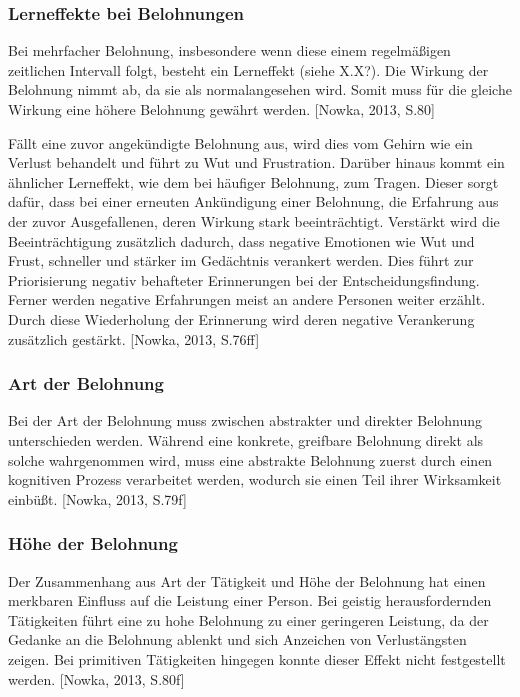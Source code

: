 \subsubsection{Lerneffekte bei Belohnungen}
Bei mehrfacher Belohnung, insbesondere wenn diese einem regelmäßigen zeitlichen Intervall folgt, besteht ein Lerneffekt (siehe X.X?). Die Wirkung der Belohnung nimmt ab, da sie als \glqq normal\grqq angesehen wird. Somit muss für die gleiche Wirkung eine höhere Belohnung gewährt werden. [Nowka, 2013, S.80]
 
Fällt eine zuvor angekündigte Belohnung aus, wird dies vom Gehirn wie ein Verlust behandelt und führt zu Wut und Frustration. Darüber hinaus kommt ein ähnlicher Lerneffekt, wie dem bei häufiger Belohnung, zum Tragen. Dieser sorgt dafür, dass bei einer erneuten Ankündigung einer Belohnung, die Erfahrung aus der zuvor Ausgefallenen, deren Wirkung stark beeinträchtigt. Verstärkt wird die Beeinträchtigung zusätzlich dadurch, dass negative Emotionen wie Wut und Frust, schneller und stärker im Gedächtnis verankert werden. Dies führt zur Priorisierung negativ behafteter Erinnerungen bei der Entscheidungsfindung. Ferner werden negative Erfahrungen meist an andere Personen weiter erzählt. Durch diese Wiederholung der Erinnerung wird deren negative Verankerung zusätzlich gestärkt. [Nowka, 2013, S.76ff]

\subsubsection{Art der Belohnung}
Bei der Art der Belohnung muss zwischen abstrakter und direkter Belohnung unterschieden werden. Während eine konkrete, greifbare Belohnung direkt als solche wahrgenommen wird, muss eine abstrakte Belohnung zuerst durch einen kognitiven Prozess verarbeitet werden, wodurch sie einen Teil ihrer Wirksamkeit einbüßt. [Nowka, 2013, S.79f]

\subsubsection{Höhe der Belohnung}
Der Zusammenhang aus Art der Tätigkeit und Höhe der Belohnung hat einen merkbaren Einfluss auf die Leistung einer Person. Bei geistig herausfordernden Tätigkeiten führt eine zu hohe Belohnung zu einer geringeren Leistung, da der Gedanke an die Belohnung ablenkt und sich Anzeichen von Verlustängsten zeigen. Bei primitiven Tätigkeiten hingegen konnte dieser Effekt nicht festgestellt werden. [Nowka, 2013, S.80f]

